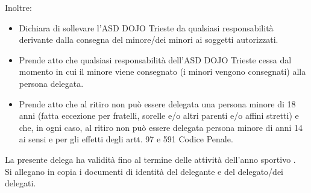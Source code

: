\documentclass{djtsmod}
\begin{document}
	Inoltre:
	\begin{itemize}
		\item Dichiara di sollevare l'ASD DOJO Trieste da qualsiasi responsabilità derivante dalla consegna del minore/dei minori ai soggetti autorizzati.
		\item Prende atto che qualsiasi responsabilità dell'ASD DOJO Trieste cessa dal momento in cui il minore viene consegnato (i minori vengono consegnati) alla persona delegata.
		\item Prende atto che al ritiro non può essere delegata una persona minore di 18 anni (fatta eccezione per fratelli, sorelle e/o altri parenti e/o affini stretti) e che, in ogni caso, al ritiro non può essere delegata persona minore di anni 14 ai sensi e per gli effetti degli artt. 97 e 591 Codice Penale.
	\end{itemize}
	La presente delega ha validità fino al termine delle attività dell'anno sportivo \field{1in}. \\[20px]
	Si allegano in copia i documenti di identità del delegante e del delegato/dei delegati.
	
	\vspace{0.3in}
\end{document}
